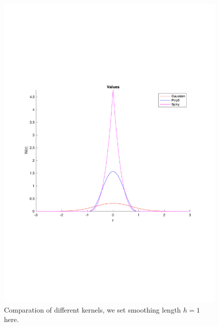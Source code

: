     \begin{figure}[!ht]
        \centering
        \includegraphics[scale = 0.5]{Figures/kernels}
        \caption{Comparation of different kernels, we set smoothing length $h = 1$ here.}
    \end{figure}

